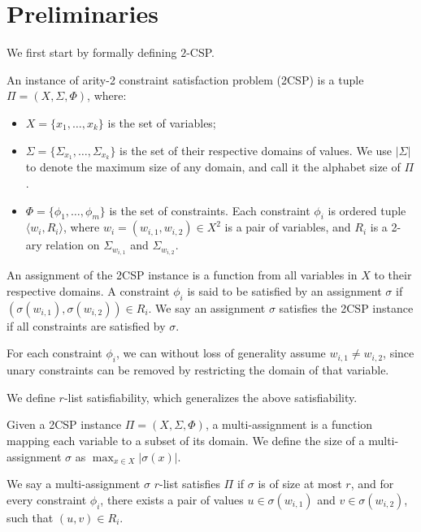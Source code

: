 \section{Preliminaries}
\label{sec:pre}
We first start by formally defining $2$-CSP.
\begin{definition}[2CSP]\label{def:2csp}
An instance of arity-2 constraint satisfaction problem (2CSP) is a tuple $\Pi=(X,\Sigma,\Phi)$, where:
\begin{itemize}
\item $X=\{x_1,\ldots,x_k\}$ is the set of variables;
\item $\Sigma=\{\Sigma_{x_1},\ldots,\Sigma_{x_k}\}$ is the set of their respective domains of values. We use $|\Sigma|$ to denote the maximum size of any domain, and call it the alphabet size of $\Pi$. 
\item $\Phi=\{\phi_1,\ldots,\phi_m\}$ is the set of constraints. Each constraint $\phi_i$ is 
 ordered tuple $\langle w_i,R_i\rangle$, where $w_i=(w_{i,1},w_{i,2}) \in X^2$ is a pair of variables, and $R_i$ is a 2-ary relation on $\Sigma_{w_{i,1}}$ and $\Sigma_{w_{i,2}}$. 
\end{itemize}

An assignment of the 2CSP instance is a function from all variables in $X$ to their respective domains. A constraint $\phi_i$ is said to be satisfied by an assignment $\sigma$ if $(\sigma(w_{i,1}),\sigma(w_{i,2}))\in R_i$. We say an assignment $\sigma$ satisfies the 2CSP instance if all constraints are satisfied by $\sigma$. 
\end{definition}

For each constraint $\phi_i$, we can without loss of generality assume $w_{i,1} \neq w_{i,2}$, since unary constraints can be removed by restricting the domain of that variable.

We define $r$-list satisfiability, which generalizes the above satisfiability. 
\begin{definition}
    Given a 2CSP instance $\Pi=(X,\Sigma,\Phi)$, a multi-assignment is a function mapping each variable to a subset of its domain. We define the size of a multi-assignment $\sigma$ as $\max_{x \in X} |\sigma(x)|$.
    
    We say a multi-assignment $\sigma$ $r$-list satisfies $\Pi$ if $\sigma$ is of size at most $r$, and for every constraint $\phi_i$, there exists a pair of values $u \in \sigma(w_{i,1})$ and $v \in \sigma(w_{i,2})$, such that $(u,v) \in R_i$.
\end{definition}

